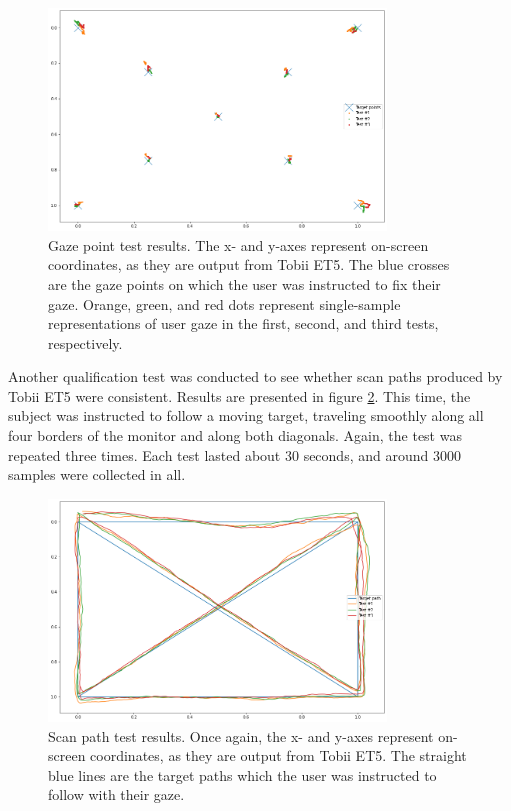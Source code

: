 \begin{figure}[h]
    \centering
    \includegraphics[width=0.8\textwidth]{Images/DataQuality/GazePointTest.png}
    \caption{Gaze point test results. The x- and y-axes represent on-screen coordinates, as they are output from Tobii ET5. The blue crosses are the gaze points on which the user was instructed to fix their gaze. Orange, green, and red dots represent single-sample representations of user gaze in the first, second, and third tests, respectively.}
    \label{fig:res_GazePointTest}
\end{figure}

\newpage
Another qualification test was conducted to see whether scan paths produced by Tobii ET5 were consistent. Results are presented in figure \ref{fig:res_ScanpathTest}. This time, the subject was instructed to follow a moving target, traveling smoothly along all four borders of the monitor and along both diagonals. Again, the test was repeated three times. Each test lasted about 30 seconds, and around 3000 samples were collected in all.

\begin{figure}[h]
    \centering
    \includegraphics[width=0.8\textwidth]{Images/DataQuality/ScanpathTest.png}
    \caption{Scan path test results. Once again, the x- and y-axes represent on-screen coordinates, as they are output from Tobii ET5. The straight blue lines are the target paths which the user was instructed to follow with their gaze. }
    \label{fig:res_ScanpathTest}
\end{figure}

